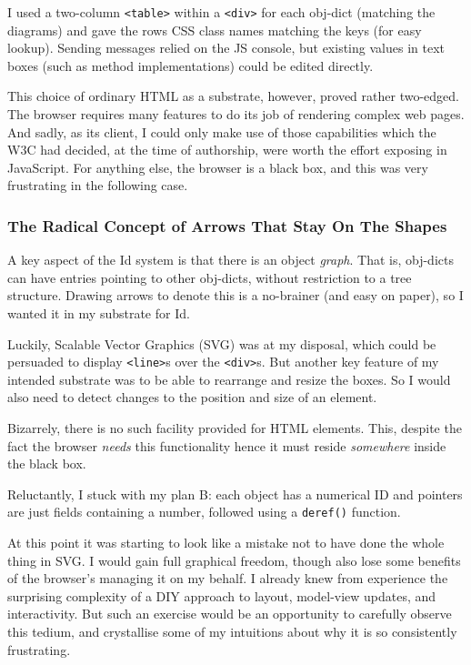 I used a two-column \texttt{\textless{}table\textgreater{}} within a
\texttt{\textless{}div\textgreater{}} for each obj-dict (matching the
diagrams) and gave the rows CSS class names matching the keys (for easy
lookup). Sending messages relied on the JS console, but existing values
in text boxes (such as method implementations) could be edited directly.

This choice of ordinary HTML as a substrate, however, proved rather
two-edged. The browser requires many features to do its job of rendering
complex web pages. And sadly, as its client, I could only make use of
those capabilities which the W3C had decided, at the time of authorship,
were worth the effort exposing in JavaScript. For anything else, the
browser is a black box, and this was very frustrating in the following
case.

\hypertarget{the-radical-concept-of-arrows-that-stay-on-the-shapes}{%
\subsubsection{The Radical Concept of Arrows That Stay On The
Shapes}\label{the-radical-concept-of-arrows-that-stay-on-the-shapes}}

A key aspect of the Id{} system is that there is an object \emph{graph}.
That is, obj-dicts can have entries pointing to other obj-dicts, without
restriction to a tree structure. Drawing arrows to denote this is a
no-brainer (and easy on paper), so I wanted it in my substrate for Id{}.

Luckily, Scalable Vector Graphics (SVG) was at my disposal, which could
be persuaded to display \texttt{\textless{}line\textgreater{}}s over the
\texttt{\textless{}div\textgreater{}}s. But another key feature of my
intended substrate was to be able to rearrange and resize the boxes. So
I would also need to detect changes to the position and size of an
element.

Bizarrely, there is no such facility provided for HTML elements. This,
despite the fact the browser \emph{needs} this functionality hence it
must reside \emph{somewhere} inside the black box.

Reluctantly, I stuck with my plan B: each object has a numerical ID and
pointers are just fields containing a number, followed using a
\texttt{deref()} function.

At this point it was starting to look like a mistake not to have done
the whole thing in SVG. I would gain full graphical freedom, though also
lose some benefits of the browser's managing it on my behalf. I already
knew from experience the surprising complexity of a DIY approach to
layout, model-view updates, and interactivity. But such an exercise
would be an opportunity to carefully observe this tedium, and
crystallise some of my intuitions about why it is so consistently
frustrating.

